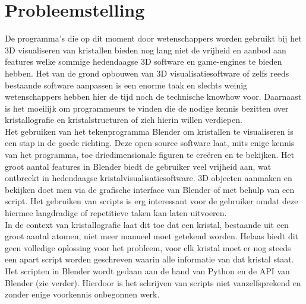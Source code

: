 \section{Probleemstelling}
De programma’s die op dit moment door wetenschappers worden gebruikt bij het 3D visualiseren van kristallen bieden nog lang niet de vrijheid en aanbod aan features welke sommige hedendaagse 3D software en game-engines te bieden hebben. Het van de grond opbouwen van 3D visualisatiesoftware of zelfs reeds bestaande software aanpassen is een enorme taak en slechts weinig wetenschappers hebben hier de tijd noch de technische knowhow voor. Daarnaast is het moeilijk om programmeurs te vinden die de nodige kennis bezitten over kristallografie en kristalstructuren of zich hierin willen verdiepen.  
\\
Het gebruiken van het tekenprogramma Blender om kristallen te visualiseren is een stap in de goede richting. Deze open source software laat, mits enige kennis van het programma, toe driedimensionale figuren te creëren en te bekijken. Het groot aantal features in Blender biedt de gebruiker veel vrijheid aan, wat ontbreekt in hedendaagse kristalvisualisatiesoftware. 3D objecten aanmaken en bekijken doet men via de grafische interface van Blender of met behulp van een script. Het gebruiken van scripts is erg interessant voor de gebruiker omdat deze hiermee langdradige of repetitieve taken kan laten uitvoeren. 
\\
In de context van kristallografie laat dit toe dat een kristal, bestaande uit een groot aantal atomen, niet meer manueel moet getekend worden. Helaas biedt dit geen volledige oplossing voor het probleem, voor elk kristal moet er nog steeds een apart script worden geschreven waarin alle informatie van dat kristal staat. Het scripten in Blender wordt gedaan aan de hand van Python en de API van Blender (zie verder). Hierdoor is het schrijven van scripts niet vanzelfsprekend en zonder enige voorkennis onbegonnen werk.

